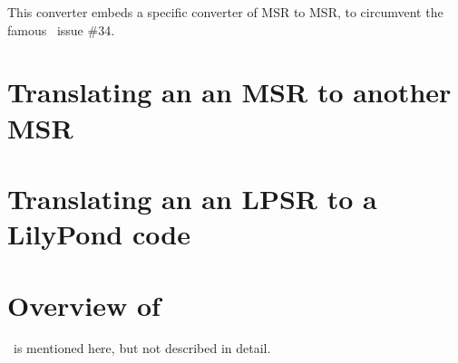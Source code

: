 \documentclass[12pt,a4paper]{article}
\begin{document}
This converter embeds a specific converter of MSR to MSR, to circumvent the famous \lily\ issue \#34.


\section{Translating an an MSR to another MSR}


\section{Translating an an LPSR to a LilyPond code}



\section{Overview of \xmlToBrl\ }
\xmlToBrl\ is mentioned here, but not described in detail.




\end{document}
